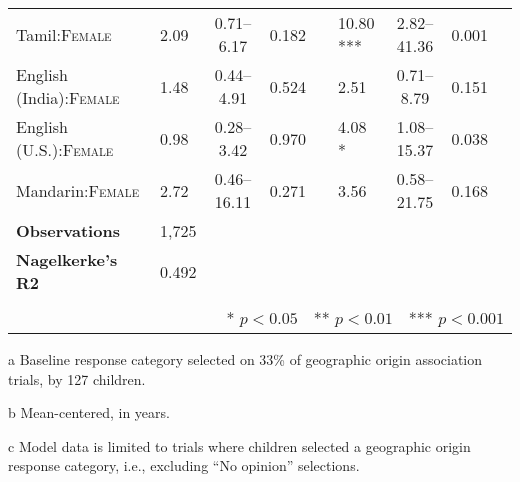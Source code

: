 \begin{table*}[t]
\begin{threeparttable}
\begin{tabular}{llcrclcrc}
 Tamil:\textsc{Female} & 2.09 & 0.71--6.17 & 0.182 &  & 10.80 *** & 2.82--41.36 & 0.001 \\ 
 English (India):\textsc{Female} & 1.48 & 0.44--4.91 & 0.524 &  & 2.51 & 0.71--8.79 & 0.151 \\ 
 English (U.S.):\textsc{Female} & 0.98 & 0.28--3.42 & 0.970 &  & 4.08 * & 1.08--15.37 & 0.038 \\ 
 Mandarin:\textsc{Female} & 2.72 & 0.46--16.11 & 0.271 &  & 3.56 & 0.58--21.75 & 0.168 \\ 
\midrule
\textbf{Observations}\tnote{c} & 1,725 & & & & & & & \\ 
\textbf{Nagelkerke's R2} & 0.492 & & & & & & & \\ 
\bottomrule\\[-.75em]
\multicolumn{9}{r}{* $p<0.05$~~** $p<0.01$~~*** $p<0.001$}\\
\end{tabular}
\begin{tablenotes}[flushleft]
    \item[a] Baseline response category selected on 33\% of geographic origin association trials, by 127 children. %
    \item[b] Mean-centered, in years.
    \item[c] Model data is limited to trials where children selected a geographic origin response category, i.e., excluding ``No opinion'' selections. 
\end{tablenotes}
\end{threeparttable}
\end{table*}